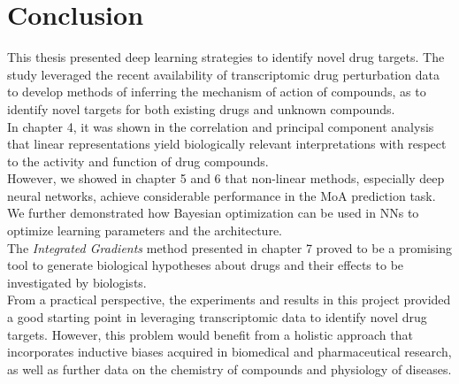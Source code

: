 \documentclass[bsc,frontabs,twoside,singlespacing,parskip,deptreport]{infthesis}     %
\begin{document}


\chapter{Conclusion}
This thesis presented deep learning strategies to identify novel drug targets. The study leveraged the recent availability of transcriptomic drug perturbation data to develop methods of inferring the mechanism of action of compounds, as to identify novel targets for both existing drugs and unknown compounds.\\
In chapter 4, it was shown in the correlation and principal component analysis that linear representations yield biologically relevant interpretations with respect to the activity and function of drug compounds.\\  However, we showed in chapter 5 and 6 that non-linear methods, especially deep neural networks, achieve considerable performance in the MoA prediction task. We further demonstrated how Bayesian optimization can be used in NNs to optimize learning parameters and the architecture. \\
The \textit{Integrated Gradients} method presented in chapter 7 proved to be a promising tool to generate biological hypotheses about drugs and their effects to be investigated by biologists.\\
From a practical perspective, the experiments and results in this project provided a good starting point in leveraging transcriptomic data to identify novel drug targets. However, this problem would benefit from a holistic approach that incorporates inductive biases acquired in biomedical and pharmaceutical research, as well as further data on the chemistry of compounds and physiology of diseases. 




\end{document}
